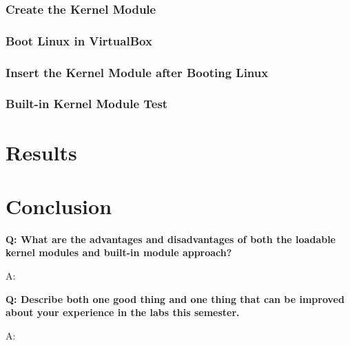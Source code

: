 \documentclass[11pt,letterpaper,titlepage]{article}
\begin{document}
\section{Create the Kernel Module}

\section{Boot Linux in VirtualBox}

\section{Insert the Kernel Module after Booting Linux}

\section{Built-in Kernel Module Test}

\newpage

\part{Results}

\newpage

\part{Conclusion}

\textbf{Q: What are the advantages and disadvantages of both the loadable kernel modules and
built-in module approach?}

A:

\textbf{Q: Describe both one good thing and one thing that can be improved about your experience
in the labs this semester.}

A: 

\newpage

\begin{appendices}

\end{appendices}
\end{document}
